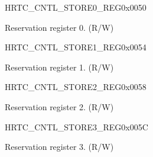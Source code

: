 \begin{register}{H}{RTC\_CNTL\_STORE0\_REG}{0x0050}\label{regdesc:RTCCNTLSTORE0REG}
%
\regnewline%
\begin{regdesc}\begin{reglist}
\label{fielddesc:RTCCNTLSCRATCH0}\item [RTC\_CNTL\_SCRATCH0] Reservation register 0. (R/W)
\end{reglist}\end{regdesc}
\end{register}


\begin{register}{H}{RTC\_CNTL\_STORE1\_REG}{0x0054}\label{regdesc:RTCCNTLSTORE1REG}
%
\regnewline%
\begin{regdesc}\begin{reglist}
\label{fielddesc:RTCCNTLSCRATCH1}\item [RTC\_CNTL\_SCRATCH1] Reservation register 1. (R/W)
\end{reglist}\end{regdesc}
\end{register}


\begin{register}{H}{RTC\_CNTL\_STORE2\_REG}{0x0058}\label{regdesc:RTCCNTLSTORE2REG}
%
\regnewline%
\begin{regdesc}\begin{reglist}
\label{fielddesc:RTCCNTLSCRATCH2}\item [RTC\_CNTL\_SCRATCH2] Reservation register 2. (R/W)
\end{reglist}\end{regdesc}
\end{register}


\begin{register}{H}{RTC\_CNTL\_STORE3\_REG}{0x005C}\label{regdesc:RTCCNTLSTORE3REG}
%
\regnewline%
\begin{regdesc}\begin{reglist}
\label{fielddesc:RTCCNTLSCRATCH3}\item [RTC\_CNTL\_SCRATCH3] Reservation register 3. (R/W)
\end{reglist}\end{regdesc}
\end{register}


